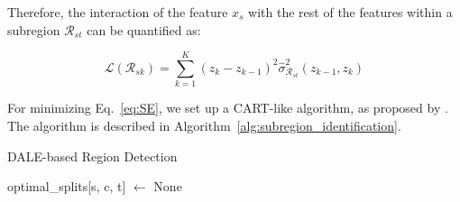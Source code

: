 \documentclass[12pt]{article}
\begin{document}
Therefore, the interaction of the feature \(x_s\) with the rest of the features within a subregion \(\mathcal{R}_{st}\)
can be quantified as:

\begin{equation}
  \label{eq:SE}
  \mathcal{L}(\mathcal{R}_{sk}) = \sum_{k=1}^K (z_k - z_{k-1})^2 \hat{\sigma}_{\mathcal{R}_{st}}^2(z_{k-1}, z_k)
\end{equation}

For minimizing Eq.~\eqref{eq:SE}, we set up a CART-like algorithm, as proposed by \citet{herbinger2023decomposing}.
The algorithm is described in Algorithm~\ref{alg:subregion_identification}.


\begin{algorithm}
\caption{DALE-based Region Detection}
\label{alg:subregion_identification}
\SetAlgoLined
{}
\BlankLine
{}
\BlankLine
{}
\BlankLine
optimal\_splits[s, c, t] $\gets$ None\;
\end{algorithm}
\end{document}
